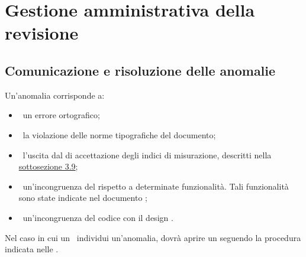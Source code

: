 
\section{Gestione amministrativa della revisione}
	\label{sec:4}
	\subsection{Comunicazione e risoluzione delle anomalie}
		Un'anomalia corrisponde a:
		\begin{itemize}
			\item\ un errore ortografico;
			\item\ la violazione delle norme tipografiche del documento;
			\item\ l'uscita dal  di accettazione degli indici di misurazione, descritti nella \hyperref[sec:3.9]{sottosezione 3.9};
			\item\ un'incongruenza del  rispetto a determinate funzionalità. Tali funzionalità sono state indicate nel documento \ARdoc;
			\item\ un'incongruenza del codice con il design .
		\end{itemize}
		Nel caso in cui un \VER\ individui un'anomalia, dovrà aprire un  seguendo la procedura indicata nelle \NPdoc.
